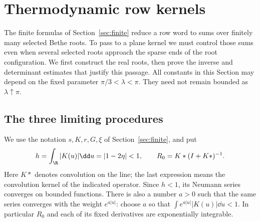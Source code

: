 \section{Thermodynamic row kernels}\label{sec:thermodynamic}

The finite formulas of Section~\ref{sec:finite} reduce a row word to
sums over finitely many selected Bethe roots.  To pass to a plane
kernel we must control those sums even when several selected roots
approach the sparse ends of the root configuration.  We first
construct the real roots, then prove the inverse and determinant
estimates that justify this passage.  All constants in this Section
may depend on the fixed parameter $\pi/3<\lambda<\pi$.  They need not
remain bounded as $\lambda\uparrow\pi$.

\subsection{The three limiting procedures}

We use the notation $s,K,r,G,\xi$ of Section~\ref{sec:finite}, and put
\[
 h=\int_{\R}|K(u)|\dd u=|1-2\eta|<1,\qquad
 R_0=K*(I+K*)^{-1}.
\]
Here $K*$ denotes convolution on the line; the last expression means
the convolution kernel of the indicated operator.  Since $h<1$, its
Neumann series converges on bounded functions.  There is also a
number $a>0$ such that the same series converges with the weight
$e^{a|u|}$: choose $a$ so that
$\int e^{a|u|}|K(u)|\dd u<1$.  In particular $R_0$ and each of its
fixed derivatives are exponentially integrable.

